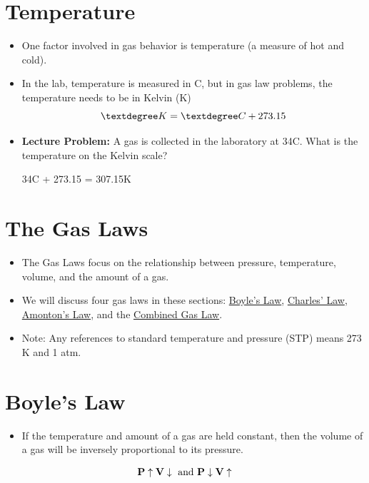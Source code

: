\documentclass[
	chapter=5,
	title={Gases},
	showanswers=true,
]{chem122notes}
\begin{document}
\section{Temperature}\label{sec:temperature}
\begin{itemize}
	\item One factor involved in gas behavior is temperature (a measure of hot and cold).
	\item In the lab, temperature is measured in \textdegree{}C, but in gas law problems, the temperature needs to be in Kelvin (K)
	\begin{equation}
		\textdegree K = \textdegree C+ 273.15
		\label{eq:kelvin-conversion}
	\end{equation}
	\item \textbf{Lecture Problem:} A gas is collected in the laboratory at 34\textdegree{}C\@. What is the temperature on the Kelvin scale?
	\begin{answer}
		34\textdegree{}C + 273.15 = 307.15\textdegree K
	\end{answer}
\end{itemize}

\section{The Gas Laws}\label{sec:the-gas-laws}
\begin{itemize}
	\item The Gas Laws focus on the relationship between pressure, temperature, volume, and the amount of a gas.
	\item We will discuss four gas laws in these sections: \hyperref[sec:boyles-law]{Boyle's Law}, \hyperref[sec:charles-law]{Charles' Law}, \hyperref[sec:amontons-law]{Amonton's Law}, and the \hyperref[the-combined-gas-law]{Combined Gas Law}.
	\item Note: Any references to standard temperature and pressure (STP\label{dfn:stp}) means 273 \textdegree{}K and 1 atm.
\end{itemize}

\section{Boyle's Law}\label{sec:boyles-law}
\begin{itemize}
	\item If the temperature and amount of a gas are held constant, then the volume of a gas will be inversely proportional to its pressure.
\end{itemize}
\begin{equation}
	\mbox{\textbf{P}}\uparrow\mbox{\textbf{V}}\downarrow \mbox{  and  } \mbox{\textbf{P}}\downarrow\mbox{\textbf{V}}\uparrow
	\label{eq:boyles-law}
\end{equation}
\end{document}
